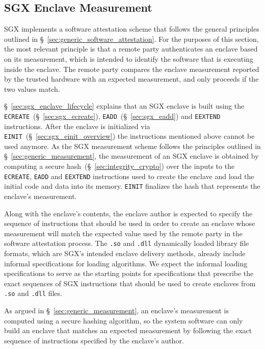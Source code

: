\subsection{SGX Enclave Measurement}
\label{sec:sgx_measurement}
\label{sec:sgx_mrenclave}

SGX implements a software attestation scheme that follows the general
principles outlined in \S~\ref{sec:generic_software_attestation}. For the
purposes of this section, the most relevant principle is that a remote party
authenticates an enclave based on its measurement, which is intended to
identify the software that is executing inside the enclave. The remote party
compares the enclave measurement reported by the trusted hardware with an
expected measurement, and only proceeds if the two values match.

\S~\ref{sec:sgx_enclave_lifecycle} explains that an SGX enclave is built using
the \texttt{ECREATE}~(\S~\ref{sec:sgx_ecreate}),
\texttt{EADD}~(\S~\ref{sec:sgx_eadd}) and \texttt{EEXTEND} instructions.
After the enclave is initialized via
\texttt{EINIT}~(\S~\ref{sec:sgx_einit_overview}) the instructions mentioned
above cannot be used anymore. As the SGX measurement scheme follows the
principles outlined in \S~\ref{sec:generic_measurement}, the measurement of an
SGX enclave is obtained by computing a secure
hash~(\S~\ref{sec:integrity_crypto}) over the inputs to the \texttt{ECREATE},
\texttt{EADD} and \texttt{EEXTEND} instructions used to create the enclave and
load the initial code and data into its memory. \texttt{EINIT} finalizes the
hash that represents the enclave's measurement.

Along with the enclave's contents, the enclave author is expected to specify
the sequence of instructions that should be used in order to create an enclave
whose measurement will match the expected value used by the remote party in the
software attestation process. The \texttt{.so} and \texttt{.dll} dynamically
loaded library file formats, which are SGX's intended enclave delivery methods,
already include informal specifications for loading algorithms. We expect the
informal loading specifications to serve as the starting points for
specifications that prescribe the exact sequences of SGX instructions that
should be used to create enclaves from \texttt{.so} and \texttt{.dll} files.

As argued in \S~\ref{sec:generic_measurement}, an enclave's measurement is
computed using a secure hashing algorithm, so the system software can only
build an enclave that matches an expected measurement by following the exact
sequence of instructions specified by the enclave's author.

